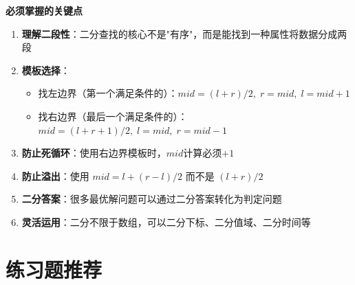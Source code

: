 \documentclass[12pt,a4paper]{article}
\begin{document}
	\begin{greenbox}
		\textbf{必须掌握的关键点}
		
		\begin{enumerate}
			\item \textbf{理解二段性}：二分查找的核心不是"有序"，而是能找到一种属性将数据分成两段
			\item \textbf{模板选择}：
			\begin{itemize}
				\item 找左边界（第一个满足条件的）：$mid = (l+r)/2, \; r = mid, \; l = mid+1$
				\item 找右边界（最后一个满足条件的）：$mid = (l+r+1)/2, \; l = mid, \; r = mid-1$
			\end{itemize}
			\item \textbf{防止死循环}：使用右边界模板时，$mid$计算必须$+1$
			\item \textbf{防止溢出}：使用 $mid = l + (r-l)/2$ 而不是 $(l+r)/2$
			\item \textbf{二分答案}：很多最优解问题可以通过二分答案转化为判定问题
			\item \textbf{灵活运用}：二分不限于数组，可以二分下标、二分值域、二分时间等
		\end{enumerate}
	\end{greenbox}
	
	\section{练习题推荐}
	
\end{document}
